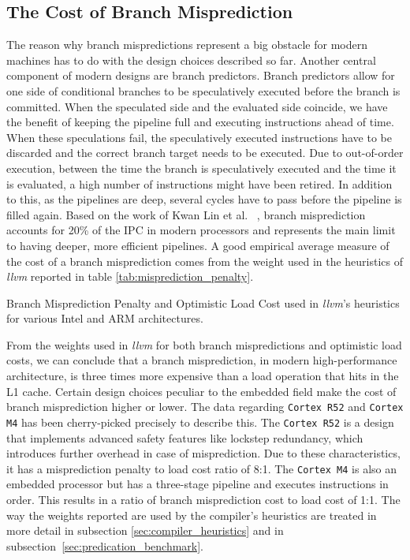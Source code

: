 \subsection{The Cost of Branch Misprediction}
\label{sec:costo_of_branch_prediction}
The reason why branch mispredictions represent a big obstacle for modern machines has to do with the design choices described so far. Another central component of modern designs are branch predictors. Branch predictors allow for one side of conditional branches to be speculatively executed before the branch is committed. When the speculated side and the evaluated side coincide, we have the benefit of keeping the pipeline full and executing instructions ahead of time. When these speculations fail, the speculatively executed instructions have to be discarded and the correct branch target needs to be executed. Due to out-of-order execution, between the time the branch is speculatively executed and the time it is evaluated, a high number of instructions might have been retired. In addition to this, as the pipelines are deep, several cycles have to pass before the pipeline is filled again. Based on the work of Kwan Lin et al. ~\cite{lin2019branch}, branch misprediction accounts for 20\% of the IPC in modern processors and represents the main limit to having deeper, more efficient pipelines. A good empirical average measure of the cost of a branch misprediction comes from the weight used in the heuristics of \textit{llvm}\cite{Lattner2004LLVM} reported in table \ref{tab:misprediction_penalty}.

\begin{table}[H]
    \captionsetup{type=table}
    \centering
    
    \caption[Branch Misprediction Penalty]{Branch Misprediction Penalty and Optimistic Load Cost used in \textit{llvm}'s heuristics for various Intel and ARM architectures.}
    \label{tab:misprediction_penalty}
\end{table}

From the weights used in \textit{llvm} for both branch mispredictions and optimistic load costs, we can conclude that a branch misprediction, in modern high-performance architecture, is three times more expensive than a load operation that hits in the L1 cache. Certain design choices peculiar to the embedded field make the cost of branch misprediction higher or lower. The data regarding \texttt{Cortex R52} and \texttt{Cortex M4} has been cherry-picked precisely to describe this. The \texttt{Cortex R52} is a design that implements advanced safety features like lockstep redundancy, which introduces further overhead in case of misprediction. Due to these characteristics, it has a misprediction penalty to load cost ratio of 8:1. The \texttt{Cortex M4} is also an embedded processor but has a three-stage pipeline and executes instructions in order. This results in a ratio of branch misprediction cost to load cost of 1:1. The way the weights reported are used by the compiler's heuristics are treated in more detail in subsection \ref{sec:compiler_heuristics} and in subsection~\ref{sec:predication_benchmark}.

